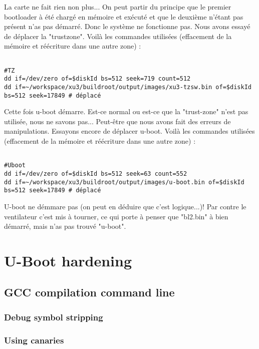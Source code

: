 La carte ne fait rien non plus... On peut partir du principe que le premier bootloader à été chargé en mémoire et exécuté et que le deuxième n'étant pas présent n'as pas démarré. Donc le système ne fonctionne pas. 
Nous avons essayé de déplacer la "trustzone". Voilà les commandes utilisées (effacement de la mémoire et réécriture dans une autre zone) : 
\begin{lstlisting}[frame=single,style=Console]  % Start your code-block

#TZ
dd if=/dev/zero of=$diskId bs=512 seek=719 count=512
dd if=~/workspace/xu3/buildroot/output/images/xu3-tzsw.bin of=$diskId bs=512 seek=17849 # déplacé
\end{lstlisting}

Cette fois u-boot démarre. Est-ce normal ou est-ce que la "trust-zone" n'est pas utilisée, nous ne savons pas... Peut-être que nous avons fait des erreurs de manipulations. Essayons encore de déplacer u-boot. 
Voilà les commandes utilisées (effacement de la mémoire et réécriture dans une autre zone) : 

\begin{lstlisting}[frame=single,style=Console]  % Start your code-block

#Uboot
dd if=/dev/zero of=$diskId bs=512 seek=63 count=552
dd if=~/workspace/xu3/buildroot/output/images/u-boot.bin of=$diskId bs=512 seek=17849 # déplacé
\end{lstlisting}

U-boot ne démmare pas (on peut en déduire que c'est logique...)! Par contre le ventilateur c'est mis à tourner, ce qui porte à penser que "bl2.bin" à bien démarré, mais n'as pas trouvé "u-boot".



\section{U-Boot hardening}

\subsection{GCC compilation command line}

\subsubsection{Debug symbol stripping}

\subsubsection{Using canaries}
